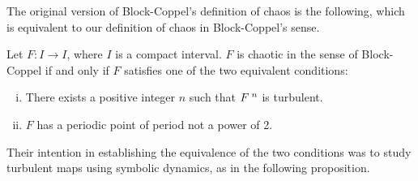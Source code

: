 \documentclass[10pt,twoside]{book}
\begin{document}
The original version of Block-Coppel's definition of chaos is the following, which is equivalent to our definition of chaos in Block-Coppel's sense.
\begin{theorem}
  \citep[Chap.II]{blockcoppel}
  Let $F: I \to I$, where $I$ is a compact interval.
  $F$ is chaotic in the sense of Block-Coppel if and only if $F$ satisfies one of the two equivalent conditions:
  \begin{enumerate}[(i)]
    \item There exists a positive integer $n$ such that $F^{\;n}$ is turbulent.
    \item $F$ has a periodic point of period not a power of 2.
  \end{enumerate}
  \label{thm:blcpII}
\end{theorem}
Their intention in establishing the equivalence of the two conditions was to study turbulent maps using symbolic dynamics, as in the following proposition.
\end{document}
